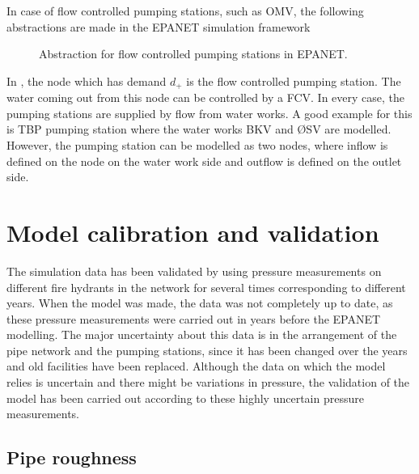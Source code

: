 In case of flow controlled pumping stations, such as OMV, the following abstractions are made in the EPANET simulation framework 

\begin{figure}[H]
\centering
 
\caption{Abstraction for flow controlled pumping stations in EPANET.}
\label{fig:FCV_EPANET}
\end{figure}

\vspace{-3mm}

In , the node which has demand $d_+$ is the flow controlled pumping station. The water coming out from this node can be controlled by a FCV. In every case, the pumping stations are supplied by flow from water works. A good example for this is TBP pumping station where the water works BKV and ØSV are modelled. However, the pumping station can be modelled as two nodes, where inflow is defined on the node on the water work side and outflow is defined on the outlet side. 

\section{Model calibration and validation}
\label{model_calibration_and_validation}

The simulation data has been validated by using pressure measurements on different fire hydrants in the network for several times corresponding to different years. When the model was made, the data was not completely up to date, as these pressure measurements were carried out in years before the EPANET modelling. The major uncertainty about this data is in the arrangement of the pipe network and the pumping stations, since it has been changed over the years and old facilities have been replaced. Although the data on which the model relies is uncertain and there might be variations in pressure, the validation of the model has been carried out according to these highly uncertain pressure measurements. 

\subsection{Pipe roughness}
\label{pipe_roughness}

